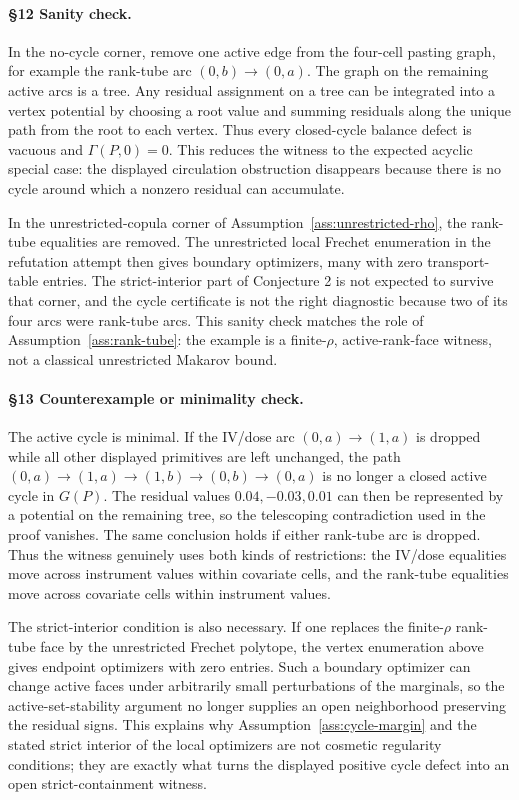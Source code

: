 \paragraph{\S12 Sanity check.}
In the no-cycle corner, remove one active edge from the four-cell pasting graph, for example the rank-tube arc \((0,b)\to(0,a)\).  The graph on the remaining active arcs is a tree.  Any residual assignment on a tree can be integrated into a vertex potential by choosing a root value and summing residuals along the unique path from the root to each vertex.  Thus every closed-cycle balance defect is vacuous and \(\Gamma(P,0)=0\).  This reduces the witness to the expected acyclic special case: the displayed circulation obstruction disappears because there is no cycle around which a nonzero residual can accumulate.

In the unrestricted-copula corner of Assumption~\ref{ass:unrestricted-rho}, the rank-tube equalities are removed.  The unrestricted local Frechet enumeration in the refutation attempt then gives boundary optimizers, many with zero transport-table entries.  The strict-interior part of Conjecture 2 is not expected to survive that corner, and the cycle certificate is not the right diagnostic because two of its four arcs were rank-tube arcs.  This sanity check matches the role of Assumption~\ref{ass:rank-tube}: the example is a finite-\(\rho\), active-rank-face witness, not a classical unrestricted Makarov bound.

\paragraph{\S13 Counterexample or minimality check.}
The active cycle is minimal.  If the IV/dose arc \((0,a)\to(1,a)\) is dropped while all other displayed primitives are left unchanged, the path \((0,a)\to(1,a)\to(1,b)\to(0,b)\to(0,a)\) is no longer a closed active cycle in \(G(P)\).  The residual values \(0.04,-0.03,0.01\) can then be represented by a potential on the remaining tree, so the telescoping contradiction used in the proof vanishes.  The same conclusion holds if either rank-tube arc is dropped.  Thus the witness genuinely uses both kinds of restrictions: the IV/dose equalities move across instrument values within covariate cells, and the rank-tube equalities move across covariate cells within instrument values.

The strict-interior condition is also necessary.  If one replaces the finite-\(\rho\) rank-tube face by the unrestricted Frechet polytope, the vertex enumeration above gives endpoint optimizers with zero entries.  Such a boundary optimizer can change active faces under arbitrarily small perturbations of the marginals, so the active-set-stability argument no longer supplies an open neighborhood preserving the residual signs.  This explains why Assumption~\ref{ass:cycle-margin} and the stated strict interior of the local optimizers are not cosmetic regularity conditions; they are exactly what turns the displayed positive cycle defect into an open strict-containment witness.

